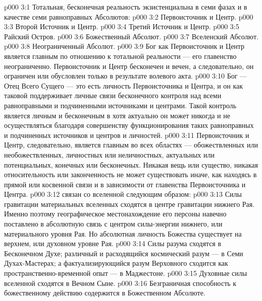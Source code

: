 \vs p000 3:1 Тотальная, бесконечная реальность экзистенциальна в семи фазах и в качестве семи равноправных Абсолютов:
\vs p000 3:2 \bibnobreakspace Первоисточник и Центр.
\vs p000 3:3 \bibnobreakspace Второй Источник и Центр.
\vs p000 3:4 \bibnobreakspace Третий Источник и Центр.
\vs p000 3:5 \bibnobreakspace Райский Остров.
\vs p000 3:6 \bibnobreakspace Божественный Абсолют.
\vs p000 3:7 \bibnobreakspace Вселенский Абсолют.
\vs p000 3:8 \bibnobreakspace Неограниченный Абсолют.
\vs p000 3:9 \pc Бог как Первоисточник и Центр является главным по отношению к тотальной реальности --- его главенство неограниченно. Первоисточник и Центр бесконечен и вечен, а следовательно, он ограничен или обусловлен только в результате волевого акта.
\vs p000 3:10 Бог --- Отец Всего Сущего --- это есть личность Первоисточника и Центра, и он как таковой поддерживает личные связи бесконечного контроля над всеми равноправными и подчиненными источниками и центрами. Такой контроль является личным и бесконечным в  хотя актуально он может никогда и не осуществляться благодаря совершенству функционирования таких равноправных и подчиненных источников и центров и личностей.
\vs p000 3:11 Первоисточник и Центр, следовательно, является главным во всех областях --- обожествленных или необожествленных, личностных или неличностных, актуальных или потенциальных, конечных или бесконечных. Никакая вещь или существо, никакая относительность или законченность не может существовать иначе, как находясь в прямой или косвенной связи и в зависимости от главенства Первоисточника и Центра.
\vs p000 3:12 \pc {} связан со вселенной следующим образом:
\vs p000 3:13 \bibnobreakspace Силы гравитации материальных вселенных сходятся в центре гравитации нижнего Рая. Именно поэтому географическое местонахождение его персоны навечно поставлено в абсолютную связь с центром силы\hyp{}энергии нижнего, или материального уровня Рая. Но абсолютная личность Божества существует на верхнем, или духовном уровне Рая.
\vs p000 3:14 \bibnobreakspace Силы разума сходятся в Бесконечном Духе; различный и расходящийся космический разум --- в Семи Духах\hyp{}Мастерах; а фактуализирующийся разум Верховного сходится как пространственно\hyp{}временной опыт --- в Маджестоне.
\vs p000 3:15 \bibnobreakspace Духовные силы вселенной сходятся в Вечном Сыне.
\vs p000 3:16 \bibnobreakspace Безграничная способность к божественному действию содержится в Божественном Абсолюте.
